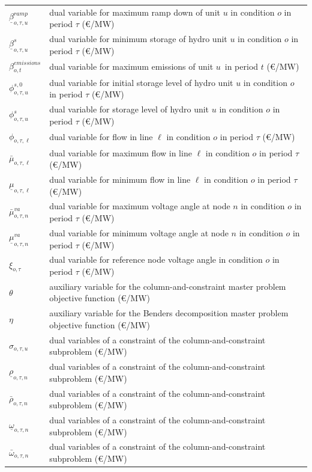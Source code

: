 \documentclass[final]{IEEEtran}
\begin{document}
\begin{supertabular}{p{1.5cm} p{6.5cm}}
	$\underline{\beta}_{o, \tau, u}^{ramp}$	& dual variable for maximum ramp down of unit $u$ in condition $o$ in period $\tau$ (€/MW) \\
	$\underline{\beta}_{o, \tau, u}^s$			& dual variable for minimum storage of hydro unit $u$ in condition $o$ in period $\tau$ (€/MW) \\
	$\beta_{o, t}^{emissions}$ 							& dual variable for maximum emissions of unit $u$ in period $t$ (€/MW) \\
	$\phi_{o, \tau, u}^{s,0}$ 							& dual variable for initial storage level of hydro unit $u$ in condition $o$ in period $\tau$ (€/MW) \\
	$\phi_{o, \tau, u}^{s}$ 								& dual variable for storage level of hydro unit $u$ in condition $o$ in period $\tau$ (€/MW) \\
	$\phi_{o, \tau, \ell}$ 									& dual variable for flow in line $\ell$ in condition $o$ in period $\tau$ (€/MW) \\
	$\bar{\mu}_{o, \tau, \ell}$							& dual variable for maximum flow in line $\ell$ in condition $o$ in period $\tau$ (€/MW) \\
	$\underline{\mu}_{o, \tau, \ell}$				& dual variable for minimum flow in line $\ell$ in condition $o$ in period $\tau$ (€/MW) \\
	$\bar{\mu}^{va}_{o, \tau, n}$						& dual variable for maximum voltage angle at node $n$ in condition $o$ in period $\tau$ (€/MW) \\
	$\underline{\mu}^{va}_{o, \tau, n}$			& dual variable for minimum voltage angle at node $n$ in condition $o$ in period $\tau$ (€/MW) \\
	$\xi_{o, \tau}$ 												& dual variable for reference node voltage angle in condition $o$ in period $\tau$ (€/MW) \\
	$\theta$																& auxiliary variable for the column-and-constraint master problem objective function (€/MW) \\
	$\eta$																	& auxiliary variable for the Benders decomposition master problem objective function (€/MW) \\
	$\sigma_{o, \tau, u}$										& dual variables of a constraint of the column-and-constraint subproblem (€/MW) \\
	$\underline{\rho}_{o, \tau, n}$					& dual variables of a constraint of the column-and-constraint subproblem (€/MW) \\
	$\bar{\rho}_{o, \tau, n}$								& dual variables of a constraint of the column-and-constraint subproblem (€/MW) \\
	$\underline{\omega}_{o, \tau, n}$				& dual variables of a constraint of the column-and-constraint subproblem (€/MW) \\
	$\bar{\omega}_{o, \tau, n}$							& dual variables of a constraint of the column-and-constraint subproblem (€/MW)
\end{supertabular}
\end{document}
